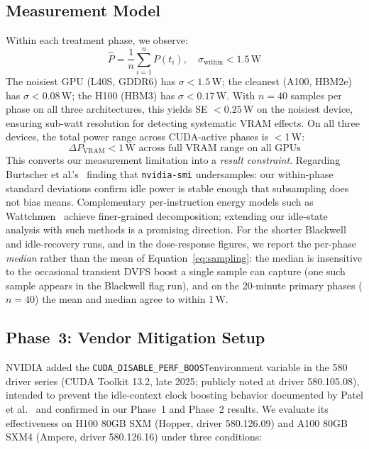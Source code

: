 \documentclass[sigconf,nonacm]{acmart}
\newcommand{\perfboost}{\texttt{CUDA\_\hspace{0pt}DISABLE\_\hspace{0pt}PERF\_\hspace{0pt}BOOST}}
\begin{document}
\subsection{Measurement Model}
\label{sec:measurement}

Within each treatment phase, we observe:
\begin{equation}
    \hat{P} = \frac{1}{n}\sum_{i=1}^{n} P(t_i), \quad \sigma_{\text{within}} < 1.5\,\text{W}
    \label{eq:sampling}
\end{equation}
The noisiest GPU (L40S, GDDR6) has $\sigma < 1.5$\,W; the cleanest (A100, HBM2e) has $\sigma < 0.08$\,W; the H100 (HBM3) has $\sigma < 0.17$\,W. With $n = 40$ samples per phase on all three architectures, this yields SE $< 0.25$\,W on the noisiest device, ensuring sub-watt resolution for detecting systematic VRAM effects. On all three devices, the total power range across CUDA-active phases is $<$1\,W:
\begin{equation}
    \Delta P_{\text{VRAM}} < 1\,\text{W across full VRAM range on all GPUs}
    \label{eq:bound}
\end{equation}
This converts our measurement limitation into a \emph{result constraint}. Regarding Burtscher et al.'s~\cite{burtscher-power} finding that \texttt{nvidia-smi} undersamples: our within-phase standard deviations confirm idle power is stable enough that subsampling does not bias means. Complementary per-instruction energy models such as Wattchmen~\cite{wattchmen} achieve finer-grained decomposition; extending our idle-state analysis with such methods is a promising direction. For the shorter Blackwell and idle-recovery runs, and in the dose-response figures, we report the per-phase \emph{median} rather than the mean of Equation~\ref{eq:sampling}: the median is insensitive to the occasional transient DVFS boost a single sample can capture (one such sample appears in the Blackwell flag run), and on the 20-minute primary phases ($n=40$) the mean and median agree to within 1\,W.

\subsection{Phase~3: Vendor Mitigation Setup}
\label{sec:perf-boost-setup}

NVIDIA added the \perfboost environment variable in the 580 driver series (CUDA Toolkit 13.2, late 2025; publicly noted at driver 580.105.08), intended to prevent the idle-context clock boosting behavior documented by Patel et al.~\cite{patel-cal23} and confirmed in our Phase~1 and Phase~2 results. We evaluate its effectiveness on H100 80GB SXM (Hopper, driver 580.126.09) and A100 80GB SXM4 (Ampere, driver 580.126.16) under three conditions:
\end{document}
